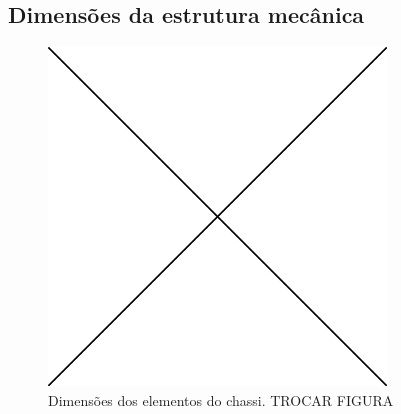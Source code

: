 \subsection{Dimensões da estrutura mecânica}
\label{sec:draw}

\begin{figure}[h]
  \centering
  \includegraphics[width =0.8\textwidth]{imagens/edc}
  \caption{Dimensões dos elementos do chassi. TROCAR FIGURA}
  \label{fig:draw}
\end{figure}
